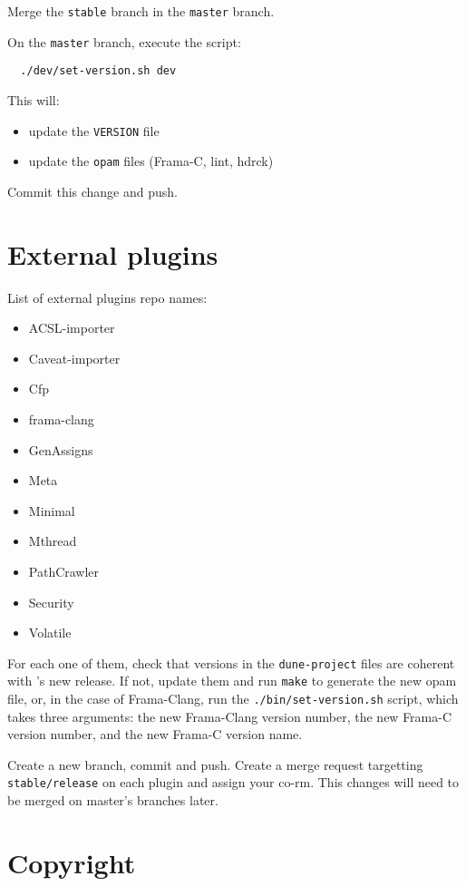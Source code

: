 Merge the \texttt{stable} branch in the \texttt{master} branch.

On the \texttt{master} branch, execute the script:
\begin{verbatim}
  ./dev/set-version.sh dev
\end{verbatim}
This will:
\begin{itemize}
  \item update the \texttt{VERSION} file
  \item update the \texttt{opam} files (Frama-C, lint, hdrck)
\end{itemize}

Commit this change and push.

\section{External plugins}
\label{sec:external-plugins}

List of external plugins repo names:
\begin{itemize}
  \item ACSL-importer
  \item Caveat-importer
  \item Cfp
  \item frama-clang
  \item GenAssigns
  \item Meta
  \item Minimal
  \item Mthread
  \item PathCrawler
  \item Security
  \item Volatile
\end{itemize}
For each one of them, check that versions in the \texttt{dune-project} files are
coherent with \FramaC's new release. If not, update them and run \verb+make+ to
generate the new opam file, or, in the case of Frama-Clang, run the
\texttt{./bin/set-version.sh} script, which takes three arguments: the
new Frama-Clang version number, the new Frama-C version number, and the new
Frama-C version name.

Create a new branch, commit and push. Create a merge
request targetting \texttt{stable/release} on each plugin and assign your co-rm.
This changes will need to be merged on master's branches later.

\section{Copyright}
\label{sec:copyright}

